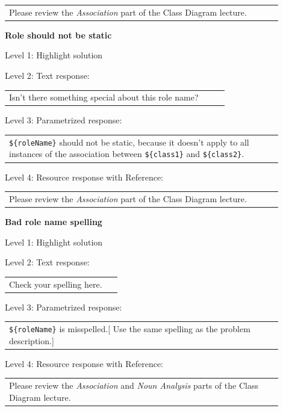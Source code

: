\begin{tabular}{|p{0.9\linewidth}}
Please review the \textit{Association} part of the Class Diagram lecture.
\end{tabular} \medskip


\noindent \textbf{Role should not be static} \medskip

\noindent Level 1: Highlight solution \medskip

\noindent Level 2: Text response: \medskip

\begin{tabular}{|p{0.9\linewidth}}
Isn't there something special about this role name?
\end{tabular} \medskip

\noindent Level 3: Parametrized response: \medskip

\begin{tabular}{|p{0.9\linewidth}}
\verb|${roleName}| should not be static, because it doesn't apply to all instances of the association between \verb|${class1}| and \verb|${class2}|.
\end{tabular} \medskip

\noindent Level 4: Resource response with Reference: \medskip

\begin{tabular}{|p{0.9\linewidth}}
Please review the \textit{Association} part of the Class Diagram lecture.
\end{tabular} \medskip


\noindent \textbf{Bad role name spelling} \medskip

\noindent Level 1: Highlight solution \medskip

\noindent Level 2: Text response: \medskip

\begin{tabular}{|p{0.9\linewidth}}
Check your spelling here.
\end{tabular} \medskip

\noindent Level 3: Parametrized response: \medskip

\begin{tabular}{|p{0.9\linewidth}}
\verb|${roleName}| is misspelled.[ Use the same spelling as the problem description.]
\end{tabular} \medskip

\noindent Level 4: Resource response with Reference: \medskip

\begin{tabular}{|p{0.9\linewidth}}
Please review the \textit{Association} and \textit{Noun Analysis} parts of the Class Diagram lecture.
\end{tabular} \medskip


